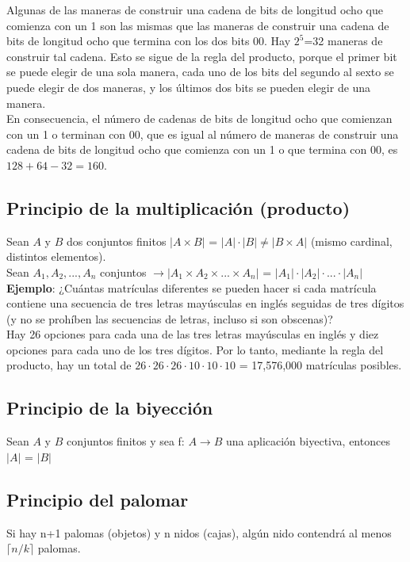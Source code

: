 \documentclass{article}
\begin{document}
Algunas de las maneras de construir una cadena de bits de longitud ocho que comienza con un 1 son las mismas que las maneras de construir una cadena de bits de longitud ocho que termina con los dos bits 00. Hay $2^5$=32 maneras de construir tal cadena. Esto se sigue de la regla del producto, porque el primer bit se puede elegir de una sola manera, cada uno de los bits del segundo al sexto se puede elegir de dos maneras, y los últimos dos bits se pueden elegir de una manera. \\

En consecuencia, el número de cadenas de bits de longitud ocho que comienzan con un 1 o terminan con 00, que es igual al número de maneras de construir una cadena de bits de longitud ocho que comienza con un 1 o que termina con 00, es $128+64-32=160$.

\subsection{Principio de la multiplicación (producto)}
Sean $A$ y $B$ dos conjuntos finitos $|A \times B|$ = $|A| \cdot |B| \neq |B \times A|$ (mismo cardinal, distintos elementos). \\
Sean $A_1, A_2, ..., A_n$ conjuntos $\xrightarrow{} |A_1 \times A_2 \times ... \times A_n|$ = $|A_1| \cdot |A_2| \cdot ... \cdot |A_n|$ \\

\textbf{Ejemplo}: ¿Cuántas matrículas diferentes se pueden hacer si cada matrícula contiene una secuencia de tres letras mayúsculas en inglés seguidas de tres dígitos (y no se prohíben las secuencias de letras, incluso si son obscenas)? \\

Hay 26 opciones para cada una de las tres letras mayúsculas en inglés y diez opciones para cada uno de los tres dígitos. Por lo tanto, mediante la regla del producto, hay un total de $26 \cdot 26 \cdot 26 \cdot 10 \cdot 10 \cdot 10$ = 17,576,000 matrículas posibles.

\subsection{Principio de la biyección}
Sean $A$ y $B$ conjuntos finitos y sea f: $A \xrightarrow{} B$ una aplicación biyectiva, entonces $|A|$ = $|B|$

\newpage

\subsection{Principio del palomar}
Si hay n+1 palomas (objetos) y n nidos (cajas), algún nido contendrá al menos $\lceil n/k \rceil$ palomas. \\
\end{document}
